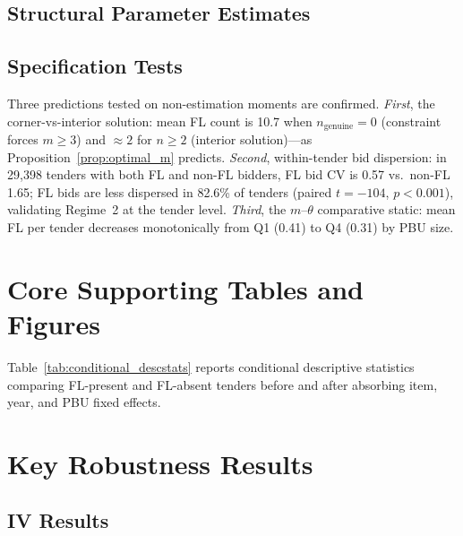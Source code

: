 \subsection{Structural Parameter Estimates}



\subsection{Specification Tests}

Three predictions tested on non-estimation moments are confirmed.
\emph{First}, the corner-vs-interior solution: mean FL count is 10.7
when $n_{\text{genuine}} = 0$ (constraint forces $m \geq 3$) and
$\approx 2$ for $n \geq 2$ (interior solution)---as
Proposition~\ref{prop:optimal_m} predicts.
\emph{Second}, within-tender bid dispersion: in 29,398 tenders with
both FL and non-FL bidders, FL bid CV is 0.57 vs.\ non-FL 1.65; FL
bids are less dispersed in 82.6\% of tenders (paired $t = -104$,
$p < 0.001$), validating Regime~2 at the tender level.
\emph{Third}, the $m$--$\theta$ comparative static: mean FL per tender
decreases monotonically from Q1 (0.41) to Q4 (0.31) by PBU size.


\section{Core Supporting Tables and Figures}
\label{app:competition}

Table~\ref{tab:conditional_descstats} reports conditional descriptive
statistics comparing FL-present and FL-absent tenders before and after
absorbing item, year, and PBU fixed effects.







\section{Key Robustness Results}
\label{app:robustness}

\subsection{IV Results}

